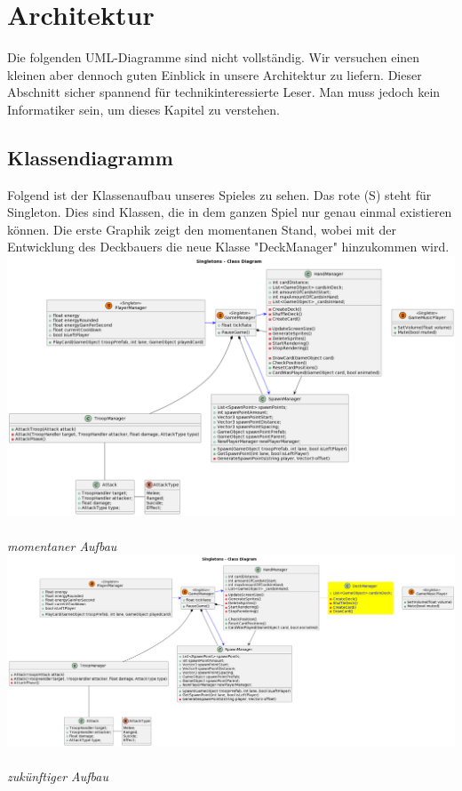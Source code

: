 \chapter{Architektur}
Die folgenden UML-Diagramme sind nicht vollständig.
Wir versuchen einen kleinen aber dennoch guten Einblick in unsere Architektur zu liefern.
Dieser Abschnitt sicher spannend für technikinteressierte Leser. Man muss jedoch kein Informatiker sein, um dieses Kapitel zu verstehen.

\section{Klassendiagramm}
Folgend ist der Klassenaufbau unseres Spieles zu sehen.
Das rote (S) steht für Singleton.
Dies sind Klassen, die in dem ganzen Spiel nur genau einmal existieren können.
Die erste Graphik zeigt den momentanen Stand, wobei mit der Entwicklung des Deckbauers die neue Klasse "DeckManager" hinzukommen wird. \\
\includegraphics[width=14cm]{resources/Singletons.png} \\
\textit{momentaner Aufbau} \\
\includegraphics[width=14.5cm]{resources/Singletons 2.png} \\
\textit{zukünftiger Aufbau}

